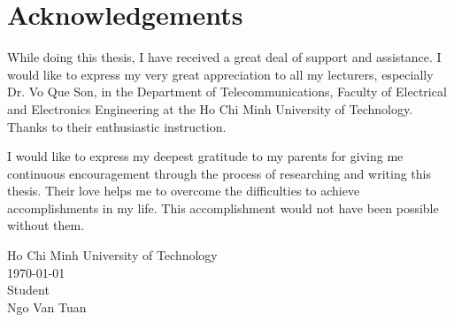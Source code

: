 \documentclass[\main/main.tex]{subfiles}
\begin{document}
\graphicspath{{imgs/}{00_misc/imgs/}}

\chapter*{Acknowledgements}
While doing this thesis, I have received a great deal of support and assistance. I would like to express my very great appreciation to all my lecturers, especially Dr. Vo Que Son, in the Department of Telecommunications, Faculty of Electrical and Electronics Engineering at the Ho Chi Minh University of Technology. Thanks to their enthusiastic instruction.

I would like to express my deepest gratitude to my parents for giving me continuous encouragement through the process of researching and writing this thesis. Their love helps me to overcome the difficulties to achieve accomplishments in my life. This accomplishment would not have been possible without them.

\begin{flushright}
\parbox[t][4cm]{8cm}
{   \centering
    Ho Chi Minh University of Technology\\
    \today\\
    Student\\
    \vspace{2cm}
    Ngo Van Tuan
}
\end{flushright}
\end{document}
